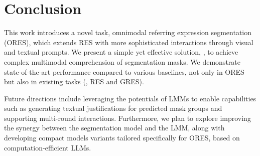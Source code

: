 \section{Conclusion}
\label{sec:con}
This work introduces a novel task, omnimodal referring expression segmentation (ORES), which extends RES with more sophisticated interactions through visual and textual prompts. We present a simple yet effective solution, \ourmodel, to achieve complex multimodal comprehension of segmentation masks. We demonstrate state-of-the-art performance compared to various baselines, not only in ORES but also in existing tasks (\ie, RES and GRES).

Future directions include leveraging the potentials of LMMs to enable capabilities such as generating textual justifications for predicted mask groups and supporting multi-round interactions. Furthermore, we plan to explore improving the synergy between the segmentation model and the LMM, along with developing compact models variants tailored specifically for ORES, based on computation-efficient LLMs.
